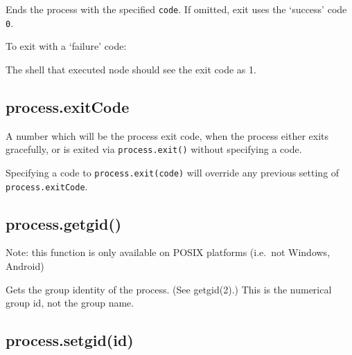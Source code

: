 Ends the process with the specified \texttt{code}. If omitted, exit uses
the `success' code \texttt{0}.

To exit with a `failure' code:

\begin{Shaded}
\begin{Highlighting}[]
\NormalTok{(}\NormalTok{);}
\end{Highlighting}
\end{Shaded}

The shell that executed node should see the exit code as 1.

\subsection{process.exitCode}\label{process.exitcode-1}

A number which will be the process exit code, when the process either
exits gracefully, or is exited via \texttt{process.exit()} without
specifying a code.

Specifying a code to \texttt{process.exit(code)} will override any
previous setting of \texttt{process.exitCode}.

\subsection{process.getgid()}\label{process.getgid}

Note: this function is only available on POSIX platforms (i.e.~not
Windows, Android)

Gets the group identity of the process. (See getgid(2).) This is the
numerical group id, not the group name.

\begin{Shaded}
\begin{Highlighting}[]
 \NormalTok{(}\NormalTok{) \{}
  \NormalTok{(} \NormalTok{+ }\NormalTok{());}
\NormalTok{\}}
\end{Highlighting}
\end{Shaded}

\subsection{process.setgid(id)}\label{process.setgidid}

